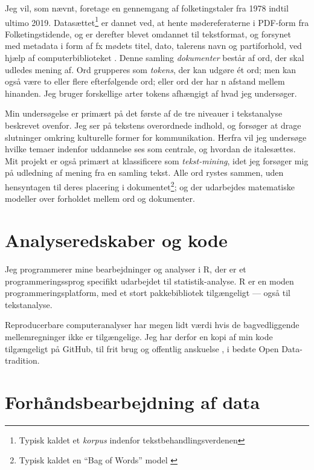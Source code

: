 Jeg vil, som nævnt, foretage en gennemgang af folketingstaler fra 1978 indtil ultimo 2019.
Datasættet\footnote{Typisk kaldet et \textit{korpus} indenfor tekstbehandlingsverdenen} er dannet ved, at hente mødereferaterne i PDF-form fra Folketingstidende, og er derefter blevet omdannet til tekstformat, og forsynet med metadata i form af fx mødets titel, dato, talerens navn og partiforhold, ved hjælp af computerbiblioteket  \autocite{pedersenFolketinget2019}.
Denne samling \textit{dokumenter} består af ord, der skal udledes mening af.
Ord grupperes som \textit{tokens}, der kan udgøre ét ord; men kan også være to eller flere efterfølgende ord; eller ord der har n afstand mellem hinanden.
Jeg bruger forskellige arter tokens afhængigt af hvad jeg undersøger.

Min undersøgelse er primært på det første af de tre niveauer i tekstanalyse beskrevet ovenfor.
Jeg ser på tekstens overordnede indhold, og forsøger at drage slutninger omkring kulturelle former for kommunikation.
Herfra vil jeg undersøge hvilke temaer indenfor uddannelse ses som centrale, og hvordan de italesættes.
Mit projekt er også primært at klassificere som \textit{tekst-mining}, idet jeg forsøger mig på udledning af mening fra en samling tekst.
Alle ord rystes sammen, uden hensyntagen til deres placering i dokumentet\footnote{Typisk kaldet en “Bag of Words” model \autocite[s. 28]{kwartlerTextMiningPractice2017}}; og der udarbejdes matematiske modeller over forholdet mellem ord og dokumenter.

\section{Analyseredskaber og kode}

Jeg programmerer mine bearbejdninger og analyser i R, der er et programmeringssprog specifikt udarbejdet til statistik-analyse\autocite{therfoundationWhat}.
R er en moden programmeringsplatform, med et stort pakkebibliotek tilgængeligt — også til tekstanalyse.

Reproducerbare computeranalyser har megen lidt værdi hvis de bagvedliggende mellemregninger ikke er tilgængelige.
Jeg har derfor en kopi af min kode tilgængeligt på GitHub, til frit brug og offentlig anskuelse \autocite{andersenNorseghostMasterthesis2020}, i bedste Open Data-tradition.

\section{Forhåndsbearbejdning af data}\label{sec:preproc}

